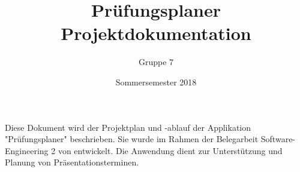 \documentclass{scrartcl}
\begin{document}
	\title{Prüfungsplaner \\ Projektdokumentation}
	\author{Gruppe 7}
	\date{Sommersemester 2018}
	\maketitle
	
	\tableofcontents
	
	Diese Dokument wird der Projektplan und -ablauf der Applikation "Prüfungsplaner" beschrieben. Sie wurde im Rahmen der Belegarbeit Software-Engineering 2 von entwickelt. Die Anwendung dient zur Unterstützung und Planung von Präsentationsterminen.
	
  
  
\end{document}
